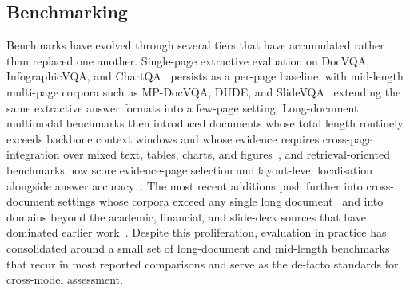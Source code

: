 \documentclass[11pt]{article}
\begin{document}
\subsection{Benchmarking}
\label{sec:data-bm}
Benchmarks have evolved through several tiers that have accumulated rather than replaced one another. Single-page extractive evaluation on DocVQA, InfographicVQA, and ChartQA~\cite{mathew2021docvqa,mathew2022infographicvqa,masry2022chartqa} persists as a per-page baseline, with mid-length multi-page corpora such as MP-DocVQA, DUDE, and SlideVQA~\cite{tito2023hierarchical,van2023dude,tanaka2023slidevqa} extending the same extractive answer formats into a few-page setting. Long-document multimodal benchmarks then introduced documents whose total length routinely exceeds backbone context windows and whose evidence requires cross-page integration over mixed text, tables, charts, and figures~\cite{ma2024mmlongbench,deng2025longdocurl,zou2024docbench,dong2025mmdocir,chia2025m}, and retrieval-oriented benchmarks now score evidence-page selection and layout-level localisation alongside answer accuracy~\cite{hui2024uda,xiong2026docr1,zhu2025doclens}. The most recent additions push further into cross-document settings whose corpora exceed any single long document~\cite{cho2024m3docrag,wang2025vidorag,tanaka2025vdocrag,suri2025visdom} and into domains beyond the academic, financial, and slide-deck sources that have dominated earlier work~\cite{chen2025svrag}. Despite this proliferation, evaluation in practice has consolidated around a small set of long-document and mid-length benchmarks that recur in most reported comparisons and serve as the de-facto standards for cross-model assessment.

\end{document}
